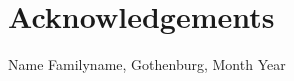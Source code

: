 \thispagestyle{plain}			%
\section*{Acknowledgements}

\vspace{1.5cm}
\hfill
Name Familyname, Gothenburg, Month Year

\newpage				%
\thispagestyle{empty}
\mbox{}